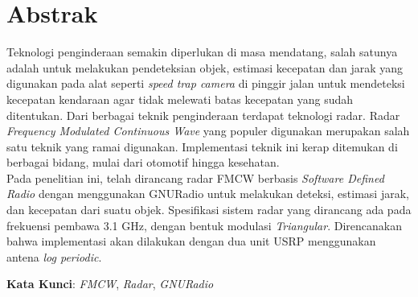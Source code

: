 
\chapter*{Abstrak}
\vspace*{0.7cm}

Teknologi penginderaan semakin diperlukan di masa mendatang, salah satunya adalah untuk melakukan pendeteksian objek, estimasi kecepatan dan jarak yang digunakan pada alat seperti \textit{speed trap camera} di pinggir jalan untuk mendeteksi kecepatan kendaraan agar tidak melewati batas kecepatan yang sudah ditentukan. Dari berbagai teknik penginderaan terdapat teknologi radar. Radar \textit{Frequency Modulated Continuous Wave} yang populer digunakan merupakan salah satu teknik yang ramai digunakan. Implementasi teknik ini kerap ditemukan di berbagai bidang, mulai dari otomotif hingga kesehatan.\\

Pada penelitian ini, telah dirancang radar FMCW berbasis \textit{Software Defined Radio} dengan menggunakan GNURadio untuk melakukan deteksi, estimasi jarak, dan kecepatan dari suatu objek. Spesifikasi sistem radar yang dirancang ada pada frekuensi pembawa 3.1 GHz, dengan bentuk modulasi \textit{Triangular}. Direncanakan bahwa implementasi akan dilakukan dengan dua unit USRP menggunakan antena \textit{log periodic}.



\vspace*{0.2cm}

\noindent \textbf{Kata Kunci}: \textit{FMCW}, \textit{Radar}, \textit{GNURadio}\\ 

\newpage